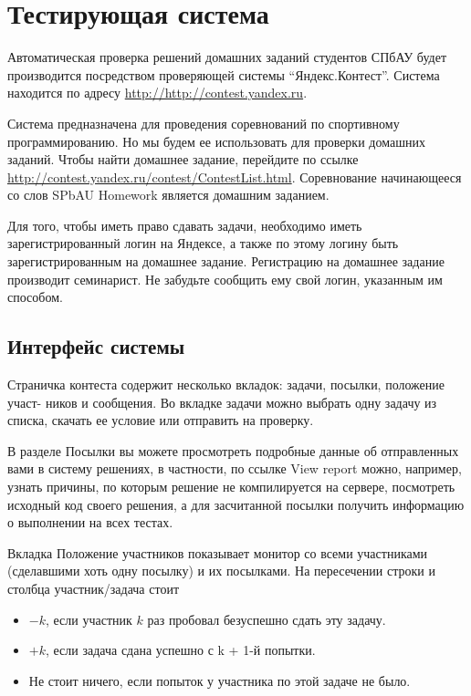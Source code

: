 \documentclass[12pt]{article}
\begin{document}
\section{Тестирующая система}

Автоматическая проверка решений домашних заданий студентов СПбАУ будет 
производится посредством проверяющей системы ``Яндекс.Контест''. 
Система находится по адресу \url{http://http://contest.yandex.ru}.

Система предназначена для проведения соревнований по спортивному
программированию. Но мы будем ее использовать для проверки домашних
заданий. Чтобы найти домашнее задание, перейдите по ссылке
\url{http://contest.yandex.ru/contest/ContestList.html}.
Соревнование начинающееся со слов SPbAU Homework является
домашним заданием.

Для того, чтобы иметь право сдавать задачи, необходимо иметь зарегистрированный
логин на Яндексе, а также по этому логину быть зарегистрированным на домашнее 
задание. Регистрацию на домашнее задание производит семинарист. Не забудьте 
сообщить ему свой логин, указанным им способом.

\subsection{Интерфейс системы}
\label{interface}

Страничка контеста содержит несколько вкладок: задачи, посылки, положение участ-
ников и сообщения. Во вкладке задачи можно выбрать одну задачу из списка, скачать
ее условие или отправить на проверку.

В разделе Посылки вы можете просмотреть подробные данные об отправленных
вами в систему решениях, в частности, по ссылке View report можно, например, узнать
причины, по которым решение не компилируется на сервере, посмотреть исходный код
своего решения, а для засчитанной посылки  получить информацию о выполнении
на всех тестах.

Вкладка Положение участников показывает монитор со всеми участниками (сделавшими хоть 
одну посылку) и их посылками. На пересечении строки и столбца участник/задача стоит
\begin{itemize}
\item $-k$, если участник $k$ раз пробовал безуспешно сдать эту задачу.
\item $+k$, если задача сдана успешно с k + 1-й попытки.
\item Не стоит ничего, если попыток у участника по этой задаче не было. 
\end{itemize}
\end{document}
